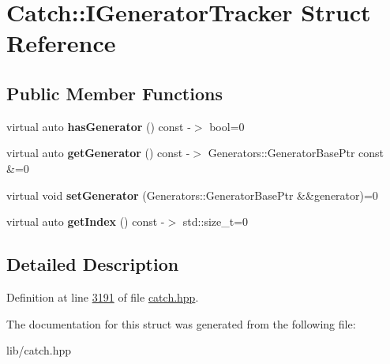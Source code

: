 \hypertarget{structCatch_1_1IGeneratorTracker}{}\section{Catch\+::I\+Generator\+Tracker Struct Reference}
\label{structCatch_1_1IGeneratorTracker}
\subsection*{Public Member Functions}
\begin{DoxyCompactItemize}
\item 
\mbox{\label{structCatch_1_1IGeneratorTracker_ae88084f9af27c8b9a5d5775b9c148498}} 
virtual auto {\bfseries has\+Generator} () const -\/$>$ bool=0
\item 
\mbox{\label{structCatch_1_1IGeneratorTracker_a23be942fc51672598bfa02c678c3078a}} 
virtual auto {\bfseries get\+Generator} () const -\/$>$ Generators\+::\+Generator\+Base\+Ptr const \&=0
\item 
\mbox{\label{structCatch_1_1IGeneratorTracker_a9945eff42219edc5a7071eebd8b0419e}} 
virtual void {\bfseries set\+Generator} (Generators\+::\+Generator\+Base\+Ptr \&\&generator)=0
\item 
\mbox{\label{structCatch_1_1IGeneratorTracker_a2922f0d8bc7a732079eadbda78e30f79}} 
virtual auto {\bfseries get\+Index} () const -\/$>$ std\+::size\+\_\+t=0
\end{DoxyCompactItemize}


\subsection{Detailed Description}


Definition at line \mbox{\hyperlink{catch_8hpp_source_l03191}{3191}} of file \mbox{\hyperlink{catch_8hpp_source}{catch.\+hpp}}.



The documentation for this struct was generated from the following file\+:\begin{DoxyCompactItemize}
\item 
lib/catch.\+hpp\end{DoxyCompactItemize}
